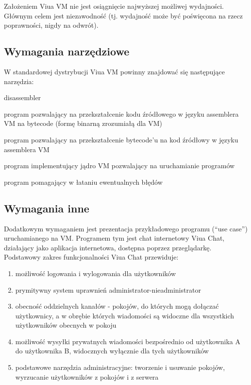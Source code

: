 \documentclass[11pt,oneside,a4paper,titlepage,onecolumn]{article}
\begin{document}
Założeniem Viua VM nie jest osiągnięcie najwyższej możliwej wydajności. Głównym celem jest niezawodność (tj.
wydajność może być poświęcona na rzecz poprawności, nigdy na odwrót).

\subsection{Wymagania narzędziowe}

W standardowej dystrybucji Viua VM powinny znajdować się następujące narzędzia:

\begin{labeling}{disassembler}
\item [\texttt{assembler}] program pozwalający na przekształcenie kodu źródłowego w języku assemblera VM
    na bytecode (formę binarną zrozumiałą dla VM)
\item [\texttt{disassembler}] program pozwalający na przekształcenie bytecode'u na kod źródłowy w języku assemblera VM
\item [\texttt{kernel}] program implementujący jądro VM pozwalający na uruchamianie programów
\item [\texttt{debugger}] program pomagający w łataniu ewentualnych błędów
\end{labeling}

\subsection{Wymagania inne}

Dodatkowym wymaganiem jest prezentacja przykładowego programu (``use case'') uruchamianego na VM.
Programem tym jest chat internetowy Viua Chat, działający jako aplikacja internetowa, dostępna poprzez przeglądarkę. Podstawowy zakres funkcjonalności Viua Chat przewiduje:

\begin{enumerate}
    \item możliwość logowania i wylogowania dla użytkowników
    \item prymitywny system uprawnień administrator-nieadministrator
    \item obecność oddzielnych kanałów - pokojów, do których mogą dołączać użytkownicy, a w obrębie których wiadomości są widoczne dla wszystkich użytkowników obecnych w pokoju
    \item możliwość wysyłki prywatnych wiadomości bezpośrednio od użytkownika A do użytkownika B, widocznych wyłącznie dla tych użytkowników
    \item podstawowe narzędzia administracyjne: tworzenie i usuwanie pokojów, wyrzucanie użytkowników z pokojów i z serwera
\end{enumerate}
\end{document}
